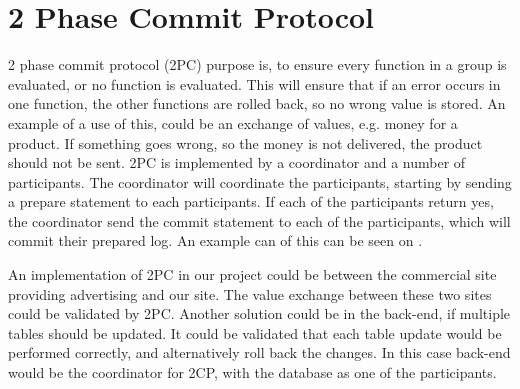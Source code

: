 \section{2 Phase Commit Protocol}
2 phase commit protocol (2PC) purpose is, to ensure every function in a group is evaluated, or no function is evaluated. This will ensure that if an error occurs in one function, the other functions are rolled back, so no wrong value is stored. An example of a use of this, could be an exchange of values, e.g. money for a product. If something goes wrong, so the money is not delivered, the product should not be sent.
2PC is implemented by a coordinator and a number of participants. The coordinator will coordinate the participants, starting by sending a prepare statement to each participants. If each of the participants return yes, the coordinator send the commit statement to each of the participants, which will commit their prepared log. An example can of this can be seen on .


An implementation of 2PC in our project could be between the commercial site providing advertising and our site. The value exchange between these two sites could be validated by 2PC. Another solution could be in the back-end, if multiple tables should be updated. It could be validated that each table update would be performed correctly, and alternatively roll back the changes. In this case back-end would be the coordinator for 2CP, with the database as one of the participants.